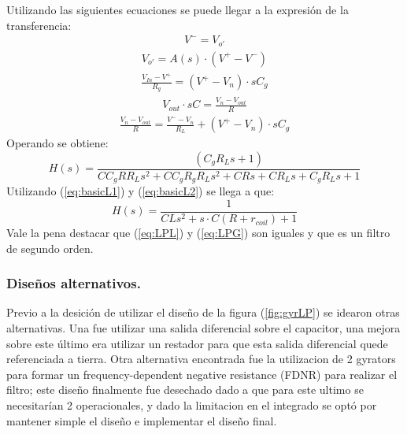 \documentclass[a4paper]{article}
\begin{document}
Utilizando las siguientes ecuaciones se puede llegar a la expresión de la transferencia:
\begin{align}V^- = V_{o'}\end{align}
\begin{align}V_{o'} = A(s)\cdot (V^+-V^-)\end{align}
\begin{align}\frac{V_{In}-V^+}{R_g}=(V^+-V_n)\cdot s C_g\end{align}
\begin{align}V_{out}\cdot s C=\frac{V_{n}-V_{out}}{R}\end{align}
\begin{align}\frac{V_{n}-V_{out}}{R}=\frac{V^--V_n}{R_L} +(V^+-V_n)\cdot s C_g\end{align}
Operando se obtiene:
\begin{equation} H(s)= \frac{\left(C_g R_L s + 1\right)}{C C_g R R_L s^{2} + C C_g R_g R_L s^{2} + C R s + C R_L s + C_g R_L s + 1}
\end{equation}
Utilizando (\ref{eq:basicL1}) y (\ref{eq:basicL2}) se llega a que:
\begin{equation} H(s)= \frac{1}{C L s^{2} + s\cdot C (R+r_{coil}) + 1}
\label{eq:LPG}
\end{equation}
Vale la pena destacar que (\ref{eq:LPL}) y (\ref{eq:LPG}) son iguales y que es un filtro de segundo orden.
\subsubsection{Diseños alternativos.}
Previo a la desición de utilizar el diseño de la figura (\ref{fig:gyrLP}) se idearon otras alternativas. Una fue utilizar una salida diferencial sobre el capacitor, una mejora sobre este último era utilizar un restador para que esta salida diferencial quede referenciada a tierra. Otra alternativa encontrada fue la utilizacion de 2 gyrators para formar un  frequency-dependent negative resistance (FDNR) para realizar el filtro; este diseño finalmente fue desechado dado a que para este ultimo se necesitarían 2 operacionales, y dado la limitacion en el integrado se optó por mantener simple el diseño e implementar el diseño final.
\end{document}
